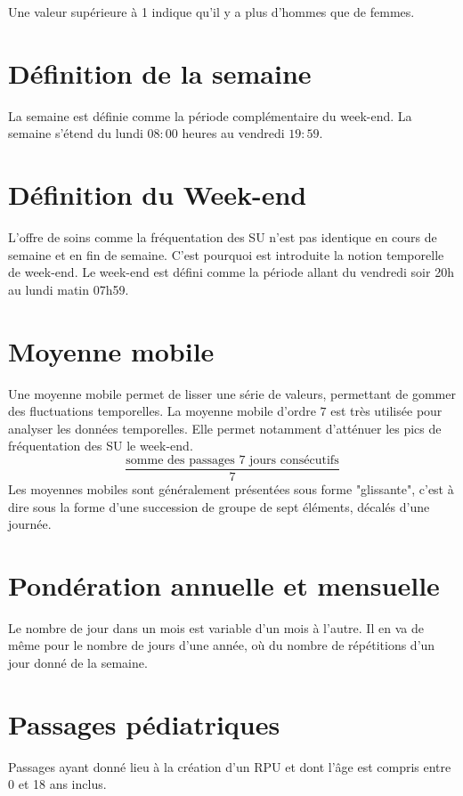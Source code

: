 \documentclass[12pt,english,french,twoside]{book}\usepackage[]{graphicx}\usepackage[]{color}
\begin{document}
Une valeur supérieure à 1 indique qu'il y a plus d'hommes que de femmes.

\section*{Définition de la semaine}
La semaine est définie comme la période complémentaire du week-end. La semaine s'étend du lundi $08:00$ heures au vendredi $19:59$.

\section*{Définition du Week-end}
L'offre de soins comme la fréquentation des SU n'est pas identique en cours de semaine et en fin de semaine. C'est pourquoi est introduite la notion temporelle de week-end.
Le week-end est défini comme la période allant du vendredi soir 20h au lundi matin 07h59.

\section*{Moyenne mobile}
Une moyenne mobile permet de lisser une série de valeurs, permettant de gommer des fluctuations temporelles. La moyenne mobile d'ordre $7$ est très utilisée pour analyser les données temporelles. Elle permet notamment d'atténuer les pics de fréquentation des SU le week-end.
\begin{displaymath}
    \frac{\text{somme des passages 7 jours consécutifs}}{7}
\end{displaymath}
Les moyennes mobiles sont généralement présentées sous forme "glissante", c'est à dire sous la forme d'une succession de groupe de sept éléments, décalés d'une journée.

\section*{Pondération annuelle et mensuelle}
Le nombre de jour dans un mois est variable d'un mois à l'autre. Il en va de même pour le nombre de jours d'une année, où du nombre de répétitions d'un jour donné de la semaine.

\section*{Passages pédiatriques}
Passages ayant donné lieu à la création d'un RPU et dont l'âge est compris entre 0 et 18 ans inclus.
\end{document}

